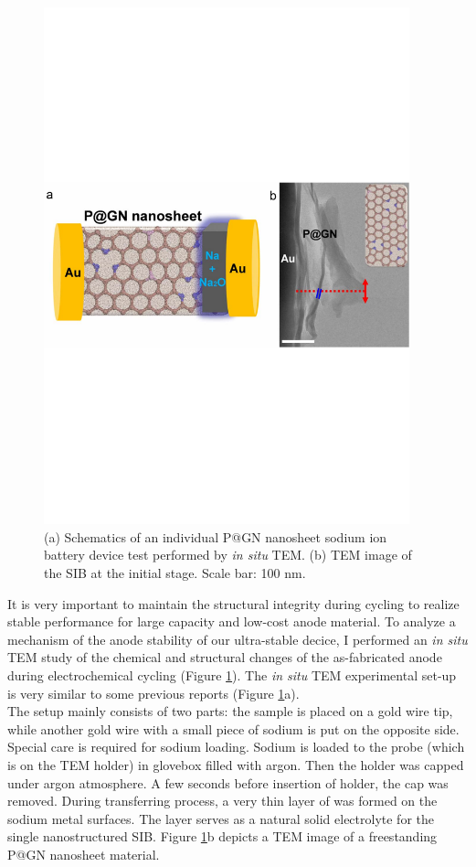 \begin{figure}  
\centering
\includegraphics[width=300pt,angle=0]{figures/figure4_3ab}
\caption[{\it In situ} probing on P@GN SIB setup]
{
(a) Schematics of an individual P@GN nanosheet sodium ion battery device test performed by {\em in situ} TEM. 
(b) TEM image of the SIB at the initial stage. Scale bar: 100 nm.
\label{fig:4_3ab}}
\end{figure}

It is very important to maintain the structural integrity during cycling to realize stable performance for large capacity and low-cost anode material.\cite{Liu2014a} 
To analyze a mechanism of the anode stability of our ultra-stable decice, I performed an {\em in situ} TEM study of the chemical and structural changes of the as-fabricated anode during electrochemical cycling (Figure \ref{fig:4_3ab}). The {\em in situ} TEM experimental set-up is very similar to some previous reports (Figure \ref{fig:4_3ab}a).\cite{Wang2014f,Wang2012g} \\
The setup mainly consists of two parts: the sample is placed on a gold wire tip, while another gold wire with a small piece of sodium is put on the opposite side. Special care is required for sodium loading. Sodium is loaded to the probe (which is on the TEM holder) in glovebox filled with argon. Then the holder was capped under argon atmosphere. A few seconds before insertion of holder, the cap was removed. 
During transferring process, a very thin layer of  was formed on the sodium metal surfaces. The  layer serves as a natural solid electrolyte for the single nanostructured SIB. Figure \ref{fig:4_3ab}b depicts a TEM image of a freestanding P@GN nanosheet material. 

